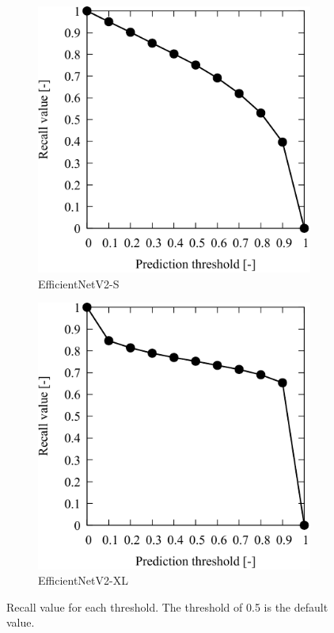 \begin{figure}[H]
    \centering
    \begin{subfigure}[t]{0.45\linewidth}
        \includegraphics[width=\linewidth]{./Figure/4_Results/training/sresult/recall.pdf}
        \caption{EfficientNetV2-S}
        \label{fig:recallResult:s}
    \end{subfigure}
    \hfill
    \begin{subfigure}[t]{0.45\linewidth}
        \includegraphics[width=\linewidth]{./Figure/4_Results/training/xlresult/recall.pdf}
        \caption{EfficientNetV2-XL}
        \label{fig:recallResult:xl}
    \end{subfigure}

    \caption{Recall value for each threshold. The threshold of \num{0.5} is the default value.} 
    \label{fig:recallResult}
\end{figure}

